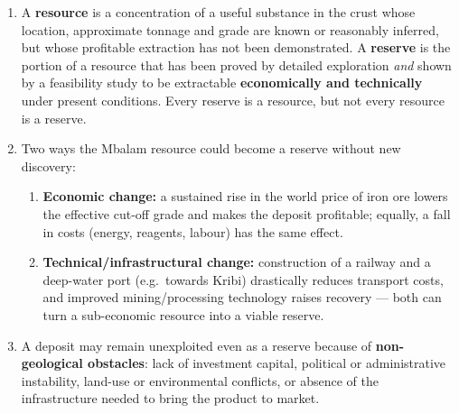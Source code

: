 \documentclass[11pt]{article}
\begin{document}
\begin{corrige}
\begin{enumerate}
\item A \textbf{resource} is a concentration of a useful substance in the crust whose location, approximate tonnage and grade are known or reasonably inferred, but whose profitable extraction has not been demonstrated. A \textbf{reserve} is the portion of a resource that has been proved by detailed exploration \emph{and} shown by a feasibility study to be extractable \textbf{economically and technically} under present conditions. Every reserve is a resource, but not every resource is a reserve.
\item Two ways the Mbalam resource could become a reserve without new discovery:
\begin{enumerate}
\item \textbf{Economic change:} a sustained rise in the world price of iron ore lowers the effective cut-off grade and makes the deposit profitable; equally, a fall in costs (energy, reagents, labour) has the same effect.
\item \textbf{Technical/infrastructural change:} construction of a railway and a deep-water port (e.g.\ towards Kribi) drastically reduces transport costs, and improved mining/processing technology raises recovery — both can turn a sub-economic resource into a viable reserve.
\end{enumerate}
\item A deposit may remain unexploited even as a reserve because of \textbf{non-geological obstacles}: lack of investment capital, political or administrative instability, land-use or environmental conflicts, or absence of the infrastructure needed to bring the product to market.
\end{enumerate}
\end{corrige}
\end{document}
